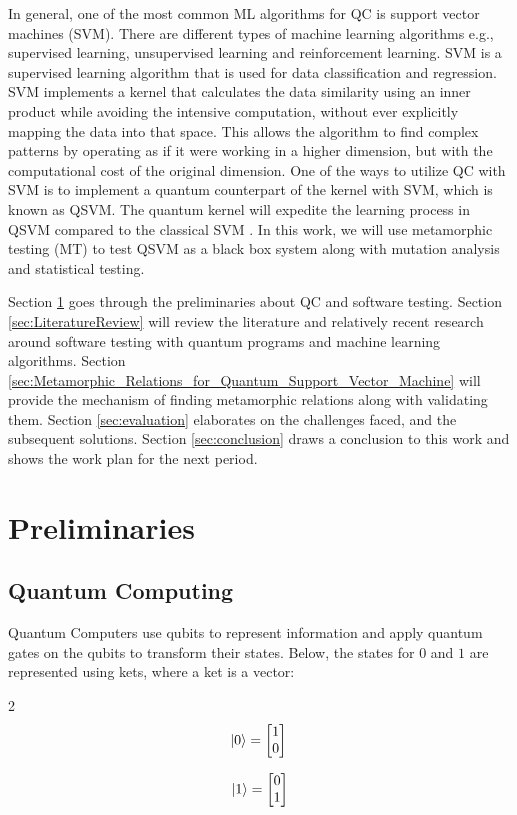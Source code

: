 \documentclass[12pt,a4paper]{article}
\DeclarePairedDelimiter\ket{\lvert}{\rangle}
\begin{document}
	In general, one of the most common ML algorithms for QC is support vector machines (SVM). There are different types of machine learning algorithms e.g., supervised learning, unsupervised learning and reinforcement learning. SVM is a supervised learning algorithm that is used for data classification and regression. SVM implements a kernel that calculates the data similarity using an inner product while avoiding the intensive computation, without ever explicitly mapping the data into that space. This allows the algorithm to find complex patterns by operating as if it were working in a higher dimension, but with the computational cost of the original dimension. One of the ways to utilize QC with SVM is to implement a quantum counterpart of the kernel with SVM, which is known as QSVM. The quantum kernel will expedite the learning process in QSVM compared to the classical SVM \cite{Rebentrost_2014} \cite{Gentinetta_2024}. In this work, we will use metamorphic testing (MT) to test QSVM as a black box system along with mutation analysis and statistical testing. 
	
	Section \ref{sec:preliminaries} goes through the preliminaries about QC and software testing. Section \ref{sec:LiteratureReview} will review the literature and relatively recent research around software testing with quantum programs and machine learning algorithms. Section \ref{sec:Metamorphic_Relations_for_Quantum_Support_Vector_Machine} will provide the mechanism of finding metamorphic relations along with validating them. Section \ref{sec:evaluation} elaborates on the challenges faced, and the subsequent solutions. Section \ref{sec:conclusion} draws a conclusion to this work and shows the work plan for the next period.
	
	
	\section {Preliminaries}
	\label{sec:preliminaries}
	
	\subsection{Quantum Computing}
	
	Quantum Computers use qubits to represent information and apply quantum gates on the qubits to transform their states. Below, the states for $0$ and $1$ are represented using kets, where a ket is a vector:
	
	\begin{multicols}{2}
		\begin{equation*}
			\ket{0} = \begin{bmatrix}
				1 \\ 0
			\end{bmatrix}\\
		\end{equation*}
		
		\begin{equation*}
			\ket{1} = \begin{bmatrix}
				0 \\ 1
			\end{bmatrix}
		\end{equation*}
	\end{multicols}
	
\end{document}
